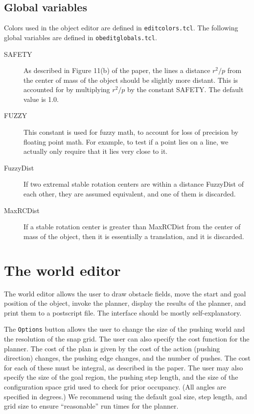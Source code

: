 \subsection{Global variables}

Colors used in the object editor are defined in {\tt editcolors.tcl}.
The following global variables are defined in 
{\tt obeditglobals.tcl}.

\begin{description}
\item[SAFETY]  As described in Figure 11(b) of the paper, the lines 
a distance $r^2/p$ from the center of mass of the object should be
slightly more distant.  This is accounted for by multiplying 
$r^2/p$ by the constant SAFETY.  The default value is 1.0.
\item[FUZZY]  This constant is used for fuzzy math, to account
for loss of precision by floating point math.  For example, to 
test if a point lies on a line, we actually only require that it
lies very close to it. 
\item[FuzzyDist]  If two extremal stable rotation centers are within a distance
FuzzyDist of each other, they are assumed equivalent, and one of them 
is discarded.  
\item [MaxRCDist]  If a stable rotation center is greater than MaxRCDist
from the center of mass of the object, then it is essentially a translation,
and it is discarded.
\end{description}

\section{The world editor}

The world editor allows the user to draw obstacle fields, move the
start and goal position of the object, invoke the planner, display
the results of the planner, and print them to a postscript file.
The interface should be mostly self-explanatory.

The {\tt Options} button allows the user to change the size of the
pushing world and the resolution of the snap grid.  The user can
also specify the cost function for the planner.  The cost of the
plan is given by the cost of the action (pushing direction) changes,
the pushing edge changes, and the number of pushes.  The cost for
each of these must be integral, as described in the paper.  The user
may also specify the size of the goal region, the pushing step length,
and the size of the configuration space grid used to check for prior
occupancy.  (All angles are specified in degrees.)  We recommend
using the default goal size, step length, and grid size to ensure
``reasonable'' run times for the planner.

